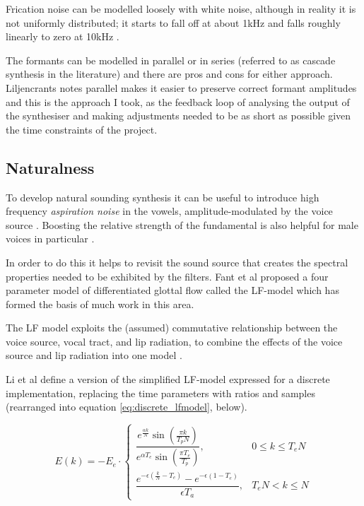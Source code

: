 Frication noise can be modelled loosely with white noise, although in reality it is not uniformly distributed; it starts to fall off at about 1kHz and falls roughly linearly to zero at 10kHz \cite{Johnson2003}.

The formants can be modelled in parallel or in series (referred to as cascade synthesis in the literature) and there are pros and cons for either approach. Liljencrants \cite{Liljencrants1995} notes parallel makes it easier to preserve correct formant amplitudes and this is the approach I took, as the feedback loop of analysing the output of the synthesiser and making adjustments needed to be as short as possible given the time constraints of the project.

\subsection{Naturalness}

To develop natural sounding synthesis it can be useful to introduce high frequency \textit{aspiration noise} in the vowels, amplitude-modulated by the voice source \cite{Klatt1990}. Boosting the relative strength of the fundamental is also helpful for male voices in particular \cite{Klatt1990}.

In order to do this it helps to revisit the sound source that creates the spectral properties needed to be exhibited by the filters. Fant et al proposed \cite{Fant1985} a four parameter model of differentiated glottal flow called the LF-model which has formed the basis of much work in this area. 

The LF model exploits the (assumed) commutative relationship between the voice source, vocal tract, and lip radiation, to combine the effects of the voice source and lip radiation into one model \cite{DelPozo2008}.

Li et al \cite{Li2011} define a version of the simplified LF-model expressed for a discrete implementation, replacing the time parameters with ratios and samples (rearranged into equation \ref{eq:discrete_lfmodel}, below).
 
\begin{equation}%
\label{eq:discrete_lfmodel}%
	E(k) = -E_e \cdot
	\begin{cases}
		\dfrac{e^{\frac{\alpha k}{N}} \sin ( \frac{\pi k}{ T_p N} )}{e^{\alpha T_e} \sin (\frac{\pi T_e}{T_p})}, & 0 \leq k \leq T_e N \\
		\dfrac{e^{-\epsilon(\frac{k}{N} - T_e)} - e^{-\epsilon(1-T_e)}}{\epsilon T_a}, & T_e N < k \leq N
	\end{cases}	
\end{equation}


